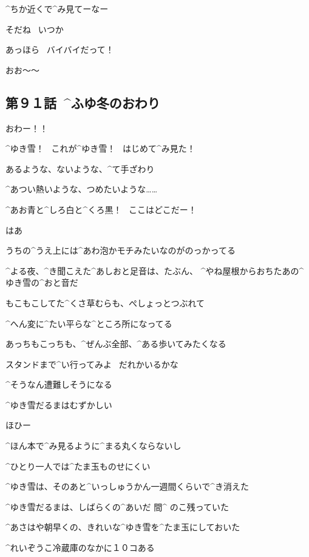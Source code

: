 \Takahiro ^{ちか}{近}くで^{み}{見}てーなー

\Alpha そだね
\ いつか

\page
\Alpha あっほら
\ バイバイだって！

\Takahiro おお〜〜


\subsection{第９１話\ ^{ふゆ}{冬}のおわり}

\page[42]
\Alpha おわー！！

\page[44]
\Alpha ^{ゆき}{雪}！
\ これが^{ゆき}{雪}！
\ はじめて^{み}{見}た！

\Alpha あるような、ないような、^{て}{手}ざわり

\Alpha ^{あつい}{熱い}ような、つめたいような……

\page
\Alpha ^{あお}{青}と^{しろ}{白}と^{くろ}{黒}！
\ ここはどこだー！

\page
\Alpha はあ

\page
\Alpha うちの^{うえ}{上}には^{あわ}{泡}かモチみたいなのがのっかってる

\Alpha ^{よる}{夜}、^{き}{聞}こえた^{あしおと}{足音}は、たぶん、
^{やね}{屋根}からおちたあの^{ゆき}{雪}の^{おと}{音}だ

\Alpha もこもこしてた^{くさ}{草}むらも、ぺしょっとつぶれて

\Alpha ^{へん}{変}に^{たい}{平}らな^{ところ}{所}になってる

\page
\Alpha あっちもこっちも、^{ぜんぶ}{全部}、^{ある}{歩}いてみたくなる

\Alpha スタンドまで^{い}{行}ってみよ
\ だれかいるかな

\Alpha ^{そうなん}{遭難}しそうになる

\page
\Alpha ^{ゆき}{雪}だるまはむずかしい

\Alpha ほひー

\Alpha ^{ほん}{本}で^{み}{見}るように^{まる}{丸}くならないし

\Alpha ^{ひとり}{一人}では^{たま}{玉}ものせにくい

\page[51]
\Alpha ^{ゆき}{雪}は、そのあと^{いっしゅうかん}{一週間}くらいで^{き}{消}えた

\Alpha ^{ゆき}{雪}だるまは、しばらくの^{あいだ }{間}^{ のこ}{残}っていた

\page
\Alpha ^{あさはや}{朝早}くの、きれいな^{ゆき}{雪}を^{たま}{玉}にしておいた

\Alpha ^{れいぞうこ}{冷蔵庫}のなかに１０コある


